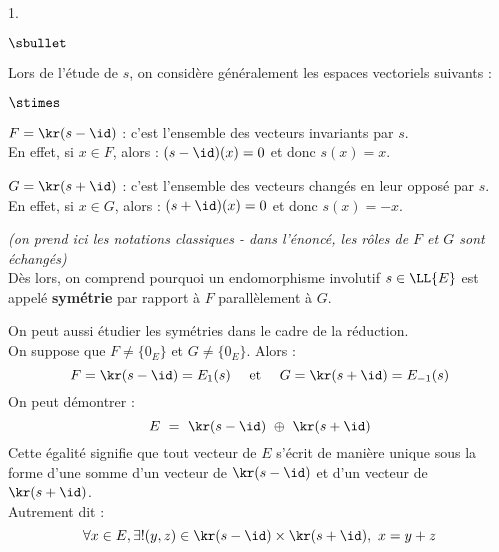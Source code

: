 \documentclass[11pt]{article}%
\begin{document}
\begin{noliste}{1.}
\begin{remark}
\begin{noliste}{$\sbullet$}
  \item Lors de l'étude de $s$, on considère généralement les espaces
    vectoriels suivants :
    \begin{noliste}{$\stimes$}
    \item $F = \kr(s - \id)$ : c'est l'ensemble des vecteurs
      invariants par $s$.\\
      En effet, si $x \in F$, alors : $(s - \id)(x) = 0$ et donc $s(x)
      = x$.
    \item $G = \kr(s + \id)$ : c'est l'ensemble des vecteurs changés
      en leur opposé par $s$.\\
      En effet, si $x \in G$, alors : $(s + \id)(x) = 0$ et donc $s(x)
      = -x$.      
    \end{noliste}
    {\it (on prend ici les notations classiques - dans l'énoncé, les
      rôles de $F$ et $G$ sont échangés)}\\[.2cm]
    Dès lors, on comprend pourquoi un endomorphisme involutif $s \in
    \LL{E}$ est appelé {\bf symétrie} par rapport à $F$ parallèlement
    à $G$.
  \item On peut aussi étudier les symétries dans le cadre de la
    réduction.\\
    On suppose que $F \neq \{ 0_E \}$ et $G \neq \{ 0_E \}$. Alors : 
    \[
    F = \kr(s - \id) = E_{1}(s) \quad \text{ et } \quad G = \kr(s +
    \id) = E_{-1}(s)
    \]
    On peut démontrer : 
    \[
    E \ = \ \kr(s - \id) \ \oplus \ \kr(s + \id)
    \]
    Cette égalité signifie que tout vecteur de $E$ s'écrit de manière
    unique sous la forme d'une somme d'un vecteur de $\kr(s - \id)$ et
    d'un vecteur de $\kr(s + \id)$.\\
    Autrement dit :
    \[
    \forall x \in E, \exists ! (y, z) \in \kr(s - \id) \times \kr(s +
    \id), \ x = y + z
    \]

\end{noliste}
\end{remark}
\end{noliste}
\end{document}
